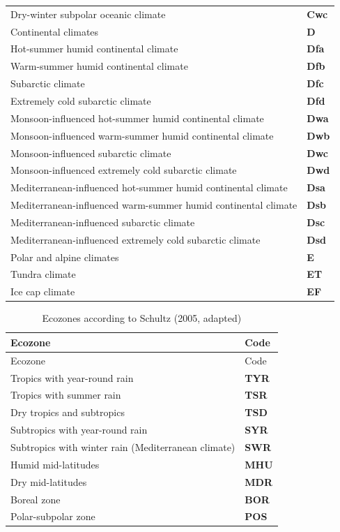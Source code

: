 \documentclass[
  letterpaper,
  DIV=11,
  numbers=noendperiod]{scrreprt}
\begin{document}
\begin{longtable}[]{@{}
  >{\raggedright\arraybackslash}p{}
  >{\raggedright\arraybackslash}p{}@{}}
Dry-winter subpolar oceanic climate & \textbf{Cwc} \\
Continental climates & \textbf{D} \\
Hot-summer humid continental climate & \textbf{Dfa} \\
Warm-summer humid continental climate & \textbf{Dfb} \\
Subarctic climate & \textbf{Dfc} \\
Extremely cold subarctic climate & \textbf{Dfd} \\
Monsoon-influenced hot-summer humid continental climate &
\textbf{Dwa} \\
Monsoon-influenced warm-summer humid continental climate &
\textbf{Dwb} \\
Monsoon-influenced subarctic climate & \textbf{Dwc} \\
Monsoon-influenced extremely cold subarctic climate & \textbf{Dwd} \\
Mediterranean-influenced hot-summer humid continental climate &
\textbf{Dsa} \\
Mediterranean-influenced warm-summer humid continental climate &
\textbf{Dsb} \\
Mediterranean-influenced subarctic climate & \textbf{Dsc} \\
Mediterranean-influenced extremely cold subarctic climate &
\textbf{Dsd} \\
Polar and alpine climates & \textbf{E} \\
Tundra climate & \textbf{ET} \\
Ice cap climate & \textbf{EF} \\
\bottomrule()
\end{longtable}

\begin{longtable}[]{@{}ll@{}}
\caption{Ecozones according to Schultz (2005, adapted)}\tabularnewline
\toprule()
Ecozone & Code \\
\midrule()
\endfirsthead
\toprule()
Ecozone & Code \\
\midrule()
\endhead
Tropics with year-round rain & \textbf{TYR} \\
Tropics with summer rain & \textbf{TSR} \\
Dry tropics and subtropics & \textbf{TSD} \\
Subtropics with year-round rain & \textbf{SYR} \\
Subtropics with winter rain (Mediterranean climate) & \textbf{SWR} \\
Humid mid-latitudes & \textbf{MHU} \\
Dry mid-latitudes & \textbf{MDR} \\
Boreal zone & \textbf{BOR} \\
Polar-subpolar zone & \textbf{POS} \\
\bottomrule()
\end{longtable}
\end{document}
